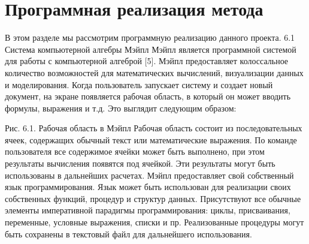 \section{Программная реализация метода}

В этом разделе мы рассмотрим программную реализацию данного проекта.
6.1  Система компьютерной алгебры Мэйпл
Мэйпл является программной системой для работы с компьютерной алгеброй [5]. Мэйпл предоставляет колоссальное количество возможностей для математических вычислений, визуализации данных и моделирования.
Когда пользователь запускает систему и создает новый документ, на экране появляется рабочая область, в который он может вводить формулы, выражения и т.д. Это выглядит следующим образом:

Рис. 6.1. Рабочая область в Мэйпл
Рабочая область состоит из последовательных ячеек, содержащих обычный текст или математические выражения. По команде пользователя все содержимое ячейки может быть выполнено, при этом результаты вычисления появятся под ячейкой. Эти результаты могут быть использованы в дальнейших расчетах.
Мэйпл предоставляет свой собственный язык программирования. Язык может быть использован для реализации своих собственных функций, процедур и структур данных. Присутствуют все обычные элементы императивной парадигмы программирования: циклы, присваивания, переменные, условные выражения, списки и пр. Реализованные процедуры могут быть сохранены в текстовый файл для дальнейшего использования.

